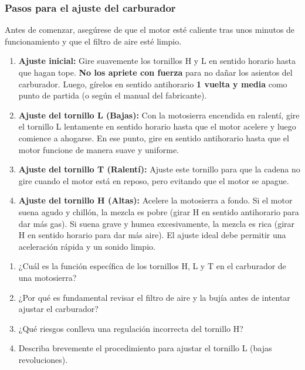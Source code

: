 \documentclass[../main]{subfiles}
\begin{document}
\subsubsection{Pasos para el ajuste del carburador}

Antes de comenzar, asegúrese de que el motor esté caliente tras unos minutos de funcionamiento y que el filtro de aire esté limpio.

\begin{enumerate}
    \item \textbf{Ajuste inicial:} Gire suavemente los tornillos H y L en sentido horario hasta que hagan tope. \textbf{No los apriete con fuerza} para no dañar los asientos del carburador. Luego, gírelos en sentido antihorario \textbf{1 vuelta y media} como punto de partida (o según el manual del fabricante).
    \item \textbf{Ajuste del tornillo L (Bajas):} Con la motosierra encendida en ralentí, gire el tornillo L lentamente en sentido horario hasta que el motor acelere y luego comience a ahogarse. En ese punto, gire en sentido antihorario hasta que el motor funcione de manera suave y uniforme.
    \item \textbf{Ajuste del tornillo T (Ralentí):} Ajuste este tornillo para que la cadena no gire cuando el motor está en reposo, pero evitando que el motor se apague.
    \item \textbf{Ajuste del tornillo H (Altas):} Acelere la motosierra a fondo. Si el motor suena agudo y chillón, la mezcla es pobre (girar H en sentido antihorario para dar más gas). Si suena grave y humea excesivamente, la mezcla es rica (girar H en sentido horario para dar más aire). El ajuste ideal debe permitir una aceleración rápida y un sonido limpio.
\end{enumerate}


\newpage

\begin{enumerate}
    \item ¿Cuál es la función específica de los tornillos H, L y T en el carburador de una motosierra?
    \item ¿Por qué es fundamental revisar el filtro de aire y la bujía antes de intentar ajustar el carburador?
    \item ¿Qué riesgos conlleva una regulación incorrecta del tornillo H?
    \item Describa brevemente el procedimiento para ajustar el tornillo L (bajas revoluciones).
\end{enumerate}
\end{document}
